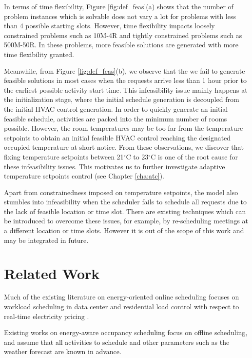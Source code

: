 In terms of time flexibility, Figure \ref{fig:def_feas}(a) shows that the number of problem instances which is solvable  does not vary a lot for problems with less than 4 possible starting slots. However, time flexibility impacts loosely constrained problems such as 10M-4R and tightly constrained problems such as 500M-50R. In these problems, more feasible solutions are generated with more time flexibility granted. 

Meanwhile, from Figure \ref{fig:def_feas}(b), we observe that the we fail to generate feasible solutions in most cases when the requests arrive less than 1 hour prior to the earliest possible activity start time. This infeasibility issue mainly happens at the initialization stage, where the initial schedule generation is decoupled from the initial HVAC control generation. In order to quickly generate an initial feasible schedule, activities are packed into the minimum number of rooms possible. However, the room temperatures may be too far from the temperature setpoints to obtain an initial feasible HVAC control reaching the designated occupied temperature at short notice. From these observations, we discover that fixing temperature setpoints between 21$^\circ$C to 23$^\circ$C is one of the root cause for these infeasibility issues. This motivates us to further investigate adaptive temperature setpoints control (see Chapter \ref{cha:atc}).

Apart from constrainedness imposed on temperature setpoints, the model also stumbles into infeasibility when the scheduler fails to schedule all requests due to the lack of feasible location or time slot. There are existing techniques which can be introduced to overcome these issues, for example, by re-scheduling meetings at a different location or time slots. However it is out of the scope of this work and may be integrated in future. 
 

\section{Related Work} \label{sec:online:related_work}

Much of the existing literature on energy-oriented online scheduling focuses on workload scheduling in data center \citep{wang2009towards,kliazovich2013dens} and residential load control with respect to real-time electricity pricing \citep{mohsenian2010optimal,scott2013residential}. 

Existing works on energy-aware occupancy scheduling \citep{chai2014minimizing,lim2015hvac,lim2015large,majumdar2016characterising,majumdar2012energy,pan2013minimizing,pan2012thermal} focus on offline scheduling, and assume that all activities to schedule and other parameters such as the weather forecast are known in advance.

